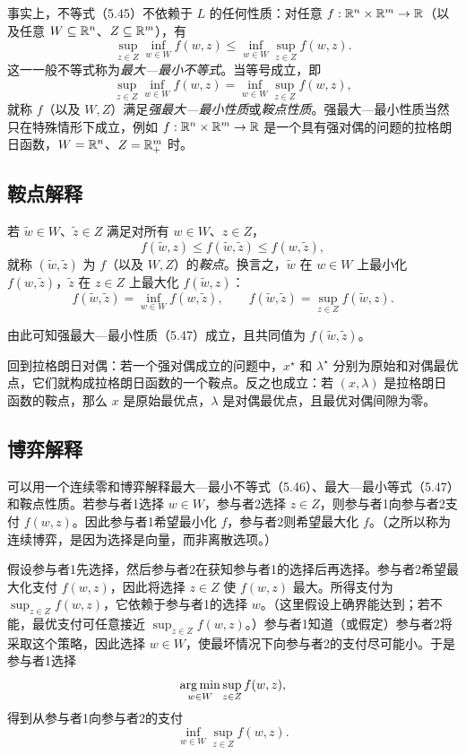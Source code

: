 事实上，不等式（5.45）不依赖于 $L$ 的任何性质：对任意 $f:\mathbb R^n\times\mathbb R^m\to\mathbb R$（以及任意 $W\subseteq\mathbb R^n$、$Z\subseteq\mathbb R^m$），有
\begin{equation}
\sup_{z\in Z}\inf_{w\in W}f(w,z)
\le\inf_{w\in W}\sup_{z\in Z}f(w,z).\tag{5.46}
\end{equation}
这一一般不等式称为\emph{最大—最小不等式}。当等号成立，即
\begin{equation}
\sup_{z\in Z}\inf_{w\in W}f(w,z)
=\inf_{w\in W}\sup_{z\in Z}f(w,z),\tag{5.47}
\end{equation}
就称 $f$（以及 $W,Z$）满足\emph{强最大—最小性质}或\emph{鞍点性质}。强最大—最小性质当然只在特殊情形下成立，例如 $f:\mathbb R^n\times\mathbb R^m\to\mathbb R$ 是一个具有强对偶的问题的拉格朗日函数，$W=\mathbb R^n$、$Z=\mathbb R_+^m$ 时。

\subsection{鞍点解释}
若 $\widetilde w\in W$、$\widetilde z\in Z$ 满足对所有 $w\in W$、$z\in Z$，
\[
f(\widetilde w,z)\le f(\widetilde w,\widetilde z)\le f(w,\widetilde z),
\]
就称 $(\widetilde w,\widetilde z)$ 为 $f$（以及 $W,Z$）的\emph{鞍点}。换言之，$\widetilde w$ 在 $w\in W$ 上最小化 $f(w,\widetilde z)$，$\widetilde z$ 在 $z\in Z$ 上最大化 $f(\widetilde w,z)$：
\[
f(\widetilde w,\widetilde z)=\inf_{w\in W}f(w,\widetilde z),\qquad
f(\widetilde w,\widetilde z)=\sup_{z\in Z}f(\widetilde w,z).
\]

由此可知强最大—最小性质（5.47）成立，且共同值为 $f(\widetilde w,\widetilde z)$。

回到拉格朗日对偶：若一个强对偶成立的问题中，$x^\star$ 和 $\lambda^\star$ 分别为原始和对偶最优点，它们就构成拉格朗日函数的一个鞍点。反之也成立：若 $(x,\lambda)$ 是拉格朗日函数的鞍点，那么 $x$ 是原始最优点，$\lambda$ 是对偶最优点，且最优对偶间隙为零。

\subsection{博弈解释}
可以用一个连续零和博弈解释最大—最小不等式（5.46）、最大—最小等式（5.47）和鞍点性质。若参与者1选择 $w\in W$，参与者2选择 $z\in Z$，则参与者1向参与者2支付 $f(w,z)$。因此参与者1希望最小化 $f$，参与者2则希望最大化 $f$。（之所以称为连续博弈，是因为选择是向量，而非离散选项。）

假设参与者1先选择，然后参与者2在获知参与者1的选择后再选择。参与者2希望最大化支付 $f(w,z)$，因此将选择 $z\in Z$ 使 $f(w,z)$ 最大。所得支付为 $\sup_{z\in Z}f(w,z)$，它依赖于参与者1的选择 $w$。（这里假设上确界能达到；若不能，最优支付可任意接近 $\sup_{z\in Z}f(w,z)$。）参与者1知道（或假定）参与者2将采取这个策略，因此选择 $w\in W$，使最坏情况下向参与者2的支付尽可能小。于是参与者1选择
\[
\operatorname*{arg\,min}_{w\in W}\sup_{z\in Z}f(w,z),
\]
得到从参与者1向参与者2的支付
\[
\inf_{w\in W}\sup_{z\in Z}f(w,z).
\]

